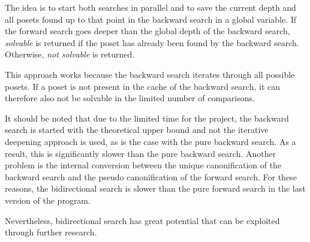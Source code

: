 \documentclass[10pt,journal,compsoc]{IEEEtran}
\newtheorem{lemma}{Lemma}
\begin{document}
The idea is to start both searches in parallel and to save the current depth and all posets found up to that point in the backward search in a global variable.
If the forward search goes deeper than the global depth of the backward search, \textit{solvable} is returned if the poset has already been found by the backward search.
Otherwise, \textit{not solvable} is returned.

This approach works because the backward search iterates through all possible posets.
If a poset is not present in the cache of the backward search, it can therefore also not be solvable in the limited number of comparisons.

It should be noted that due to the limited time for the project, the backward search is started with the theoretical upper bound and not the iterative deepening approach is used, as is the case with the pure backward search.
As a result, this is significantly slower than the pure backward search.
Another problem is the internal conversion between the unique canonification of the backward search and the pseudo canonification of the forward search.
For these reasons, the bidirectional search is slower than the pure forward search in the last version of the program.

Nevertheless, bidirectional search has great potential that can be exploited through further research.






\end{document}
